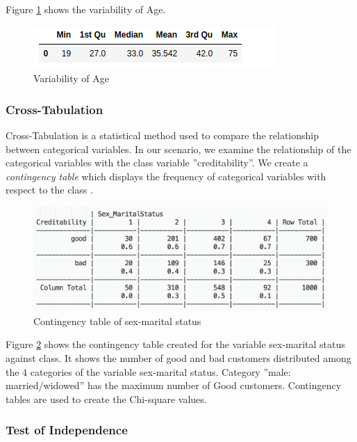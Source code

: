 \documentclass[sigconf]{acmart}
\begin{document}
Figure \ref{fig:Figure17} shows the variability of Age.

\begin{figure}[htb]
  \centering
  \includegraphics[width=1.0\columnwidth]{images/Figure17.png}
  \caption{Variability of Age}
  \label{fig:Figure17} 
\end{figure}

\subsubsection{Cross-Tabulation}

Cross-Tabulation is a statistical method used to compare the relationship between categorical variables. In our scenario, we examine the relationship of the categorical variables with the class variable ''creditability''. We create a \emph{contingency table} which displays the frequency of categorical variables with respect to the class \cite{cross-tabulation}. 

\begin{figure}[htb]
  \centering
  \includegraphics[width=1.0\columnwidth]{images/Figure18.png}
  \caption{Contingency table of sex-marital status
  \cite{psu-site}}
  \label{fig:Figure18} 
\end{figure}

Figure \ref{fig:Figure18} shows the contingency table created for the variable sex-marital status against class. It shows the number of good and bad customers distributed among the 4 categories of the variable sex-marital status. Category ''male: married/widowed'' has the maximum number of Good customers. Contingency tables are used to create the Chi-square values.

\subsubsection{Test of Independence}
\end{document}
